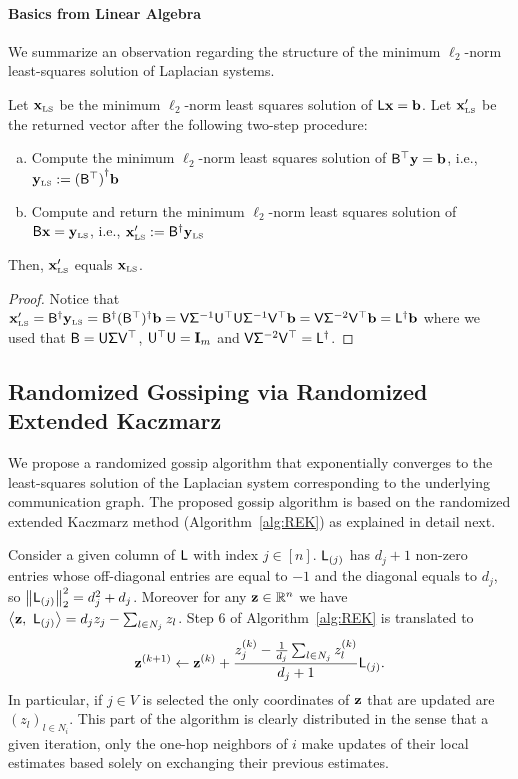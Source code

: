 \paragraph{Basics from Linear Algebra}\label{sec:linAlgebra}
%
We summarize an observation regarding the structure of the minimum $\ell_2$-norm least-squares solution of Laplacian systems.
\begin{lemma}\label{lem:charLS}
	Let $\mathbf{x}_{\textrm{\tiny LS}}$ be the minimum $\ell_2$-norm least squares solution of ${\mathsf{L} } \mathbf{x} = {\mathbf b}$. Let $\mathbf{x}_{\textrm{\tiny LS}}'$ be the returned vector after the following two-step procedure:
	\begin{enumerate}[(a)]
		\item
		Compute the minimum $\ell_2$-norm least squares solution of ${\mathsf{B} }^\top \mathbf{y} = {\mathbf b}$, i.e., $\mathbf{y}_{\textrm{\tiny LS}} :={({\mathsf{B} }^\top)}^\dagger {\mathbf b}  $
		\item
		Compute and return the minimum $\ell_2$-norm least squares solution of ${\mathsf{B} } \mathbf{x} = \mathbf{y}_{\textrm{\tiny LS}}$, i.e., $\mathbf{x}_{\textrm{\tiny LS}}' :={{\mathsf{B} }}^\dagger \mathbf{y}_{\textrm{\tiny LS}} $
	\end{enumerate}
Then, $\mathbf{x}_{\textrm{\tiny LS}}'$ equals $\mathbf{x}_{\textrm{\tiny LS}}$.
\end{lemma}
\begin{proof}
Notice that $\mathbf{x}_{\textrm{\tiny LS}}' = {{\mathsf{B} }}^\dagger \mathbf{y}_{\textrm{\tiny LS}} = {{\mathsf{B} }}^\dagger ({\mathsf{B} }^\top)^{\dagger} {\mathbf b} = {\mathsf{V} } {\mathsf{\Sigma} }^{-1}{\mathsf{U} }^{\top} {\mathsf{U} } {\mathsf{\Sigma} }^{-1}{\mathsf{V} }^{\top} {\mathbf b}  = {\mathsf{V} } {\mathsf{\Sigma} }^{-2} {\mathsf{V} }^{\top} {\mathbf b} = {{\mathsf{L} }}^\dagger{\mathbf b}$ where we used that ${\mathsf{B} } = {\mathsf{U} }{\mathsf{\Sigma} }{\mathsf{V} }^\top $, ${\mathsf{U} }^{\top} {\mathsf{U} } = \mathbf{I}_m$ and ${\mathsf{V} } {\mathsf{\Sigma} }^{-2} {\mathsf{V} }^{\top} = {{\mathsf{L} }}^\dagger$.
\end{proof}
%
%
\subsection{Randomized Gossiping via Randomized Extended Kaczmarz}\label{sec:LaplacianGossip}
%
We propose a randomized gossip algorithm that exponentially converges to the least-squares solution of the Laplacian system corresponding to the underlying communication graph. The proposed gossip algorithm is based on the randomized extended Kaczmarz method (Algorithm~\ref{alg:REK}) as explained in detail next.
%

%
Consider a given column of ${\mathsf{L} }$ with index $j\in [n]$. ${\mathsf{L} }_{(j)}$ has $d_j + 1$ non-zero entries whose off-diagonal entries are equal to $-1$ and the diagonal equals to $d_j$, so $\left\|{\mathsf{L} }_{(j)}\right\|_2^2 = d_j^2 + d_j$. Moreover for any $\mathbf{z}\in\mathbb{R}^n$ we have $\left\langle {\mathbf{z}},\ {{\mathsf{L} }_{(j)}} \right\rangle =  d_j z_j - \sum_{l\in N_j} z_{l}$. Step $6$ of Algorithm~\ref{alg:REK} is translated to
%
\[ \mathbf{z}^{(k+1)} \leftarrow \mathbf{z}^{(k)} + \frac{ z_j^{(k)} - \frac1{d_j}\sum_{l\in N_j} z^{(k)}_{l}}{d_j + 1} {\mathsf{L} }_{(j)}.\]
%
In particular, if $j\in V$ is selected the only coordinates of $\mathbf{z}$ that are updated are $(z_{l})_{l\in N_i}$. This part of the algorithm is clearly distributed in the sense that a given iteration, only the one-hop neighbors of $i$ make updates of their local estimates based solely on exchanging their previous estimates.


